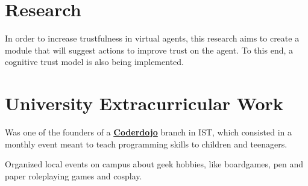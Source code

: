 \documentclass[letterpaper]{deedy-resume} %
\begin{document}
\begin{minipage}[t]{0.64\textwidth}
\sectionspace %



\section{Research}


In order to increase trustfulness in virtual agents, this research aims to create a module that will suggest actions to improve trust on the agent. To this end, a cognitive trust model is also being implemented.


\sectionspace %


\section{University Extracurricular Work}


Was one of the founders of a \textbf{\href{https://coderdojo.com/}{Coderdojo}} branch in IST, which consisted in a monthly event meant to teach programming skills to children and teenagers.

\sectionspace %



Organized local events on campus about geek hobbies, like boardgames, pen and paper roleplaying games and cosplay.

\sectionspace %





\end{minipage} %
\end{document}
